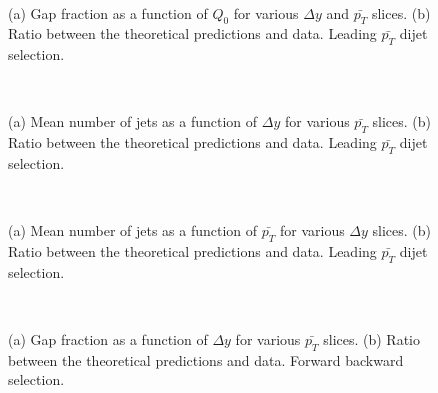 \begin{figure}
\centering
\mbox{
              \quad
              \quad
}
\caption[Gap fraction as a function of $Q_0$ for leading $p_T$ dijet selection]{ (a) Gap fraction as a function of $Q_0$ for various $\Delta y$ and $\bar{p_T}$ slices. (b) Ratio between the theoretical predictions and data. Leading $\bar{p_T}$ dijet selection.
\label{GBJ1:Q0SelA}}
\end{figure}

\begin{figure}
\centering
\mbox{
              \quad
              \quad
}
\caption[Mean number of jets as a function of $\Delta y$ for leading $p_T$ dijet selection]{ (a) Mean number of jets as a function of $\Delta y$ for various $\bar{p_T}$ slices. (b) Ratio between the theoretical predictions and data. Leading $\bar{p_T}$ dijet selection.
\label{GBJ1:NjetsdYSelA}}
\end{figure}

\begin{figure}
\centering
\mbox{
              \quad
              \quad
}
\caption[Mean number of jets as a function of $\bar{p_T}$ for leading $p_T$ dijet selection]{ (a) Mean number of jets as a function of $\bar{p_T}$ for various $\Delta y$ slices. (b) Ratio between the theoretical predictions and data. Leading $\bar{p_T}$ dijet selection.
\label{GBJ1:NjetspTSelA}}
\end{figure}


\begin{figure}
\centering
\mbox{
              \quad
              \quad
}
\caption[Gap fraction as a function of $\Delta y$ for forward backward selection]{ (a) Gap fraction as a function of $\Delta y$ for various $\bar{p_T}$ slices. (b) Ratio between the theoretical predictions and data. Forward backward selection.
\label{GBJ1:dYSelB}}
\end{figure}

